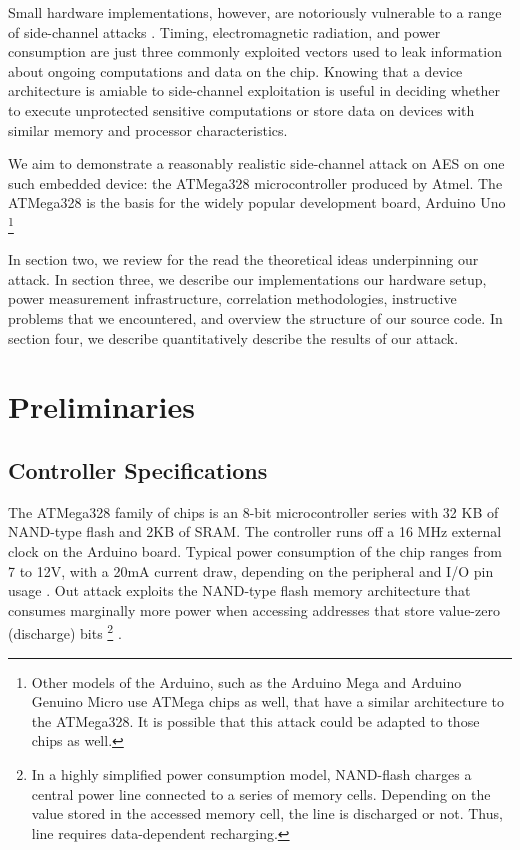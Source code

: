 \documentclass[journal]{ieee_style}
\begin{document}
Small hardware implementations, however, are notoriously vulnerable to a range of side-channel attacks \cite{smalldevice}. Timing, electromagnetic radiation, and power consumption are just three commonly exploited vectors used to leak information about ongoing computations and data on the chip. Knowing that a device architecture is amiable to side-channel exploitation is useful in deciding whether to execute unprotected sensitive computations or store data on devices with similar memory and processor characteristics.

We aim to demonstrate a reasonably realistic side-channel attack on AES on one such embedded device: the ATMega328 microcontroller produced by Atmel. The ATMega328 is the basis for the widely popular development board, Arduino Uno \footnote{Other models of the Arduino, such as the Arduino Mega and Arduino Genuino Micro use ATMega chips as well, that have a similar architecture to the ATMega328. It is possible that this attack could be adapted to those chips as well.}

In section two, we review for the read the theoretical ideas underpinning our attack. In section three, we describe our implementations our hardware setup, power measurement infrastructure, correlation methodologies, instructive problems that we encountered, and overview the structure of our source code. In section four, we describe quantitatively describe the results of our attack.

\section{Preliminaries}
\subsection{Controller Specifications}
The ATMega328 family of chips is an 8-bit microcontroller series with 32 KB of NAND-type flash and 2KB of SRAM. The controller runs off a 16 MHz external clock on the Arduino board. Typical power consumption of the chip ranges from 7 to 12V, with a 20mA current draw, depending on the peripheral and I/O pin usage \cite{atmeldatasheet}. Out attack exploits the NAND-type flash memory architecture that consumes marginally more power when accessing addresses that store value-zero (discharge) bits \footnote{In a highly simplified power consumption model, NAND-flash charges a central power line connected to a series of memory cells. Depending on the value stored in the accessed memory cell, the line is discharged or not. Thus, line requires data-dependent recharging.} \cite{nandflash}.
\end{document}
